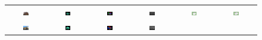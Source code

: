 \documentclass[10pt,journal,cspaper,compsoc]{IEEEtran}
\begin{document}
\begin{figure}[htbp]
\begin{center}
\begin{tabular}{cccccc}
\includegraphics[width=0.15\textwidth]{real_cu_1.jpg} &
\includegraphics[width=0.15\textwidth]{real_cu_2.png} &
\includegraphics[width=0.15\textwidth]{real_cu_7.png} &
\includegraphics[width=0.15\textwidth]{real_cu_9.png} &
\includegraphics[width=0.15\textwidth]{real_cu_10.png} &
\includegraphics[width=0.15\textwidth]{real_cu_3.png} \\
\includegraphics[width=0.15\textwidth]{opernhaus_1.png} &
\includegraphics[width=0.15\textwidth]{opernhaus_2.png} &
\includegraphics[width=0.15\textwidth]{opernhaus_3.png} &
\includegraphics[width=0.15\textwidth]{opernhaus_4.png} &

\end{tabular}
\end{center}
\end{figure}
\end{document}
